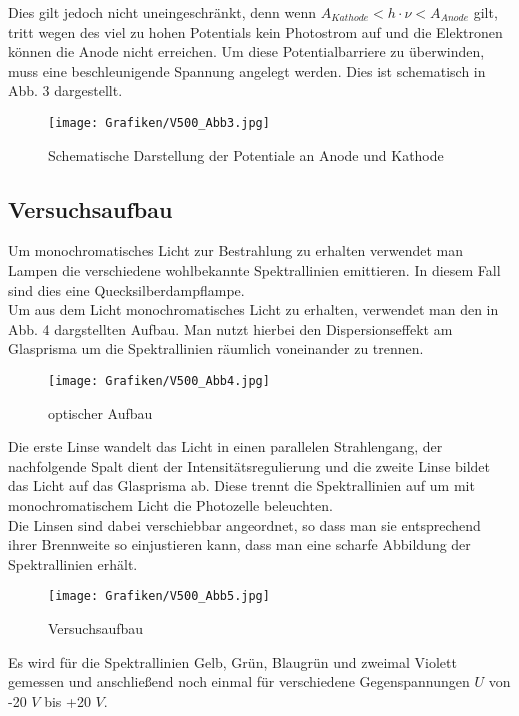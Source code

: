 Dies gilt jedoch nicht uneingeschränkt, denn wenn $A_{Kathode} < h \cdot \nu <  A_{Anode}$ gilt, tritt wegen des viel zu hohen Potentials kein Photostrom auf und die Elektronen können die Anode nicht erreichen. Um diese Potentialbarriere zu überwinden, muss eine beschleunigende Spannung angelegt werden. Dies ist schematisch in Abb. 3 dargestellt.\\

\begin{figure}[h]
	\centering
	\texttt{[image: Grafiken/V500\_Abb3.jpg]}
	\caption{Schematische Darstellung der Potentiale an Anode und Kathode}
\end{figure}

\subsection{Versuchsaufbau}

Um monochromatisches Licht zur Bestrahlung zu erhalten verwendet man Lampen die verschiedene wohlbekannte Spektrallinien emittieren. In diesem Fall sind dies eine Quecksilberdampflampe.\\
Um aus dem Licht monochromatisches Licht zu erhalten, verwendet man den in Abb. 4 dargstellten Aufbau. Man nutzt hierbei den Dispersionseffekt am Glasprisma um die Spektrallinien räumlich voneinander zu trennen. 

\begin{figure}[h]
	\centering
	\texttt{[image: Grafiken/V500\_Abb4.jpg]}
	\caption{optischer Aufbau}
\end{figure}

Die erste Linse wandelt das Licht in einen parallelen Strahlengang, der nachfolgende Spalt dient der Intensitätsregulierung und die zweite Linse bildet das Licht auf das Glasprisma ab. Diese trennt die Spektrallinien auf um mit monochromatischem Licht die Photozelle beleuchten.\\
Die Linsen sind dabei verschiebbar angeordnet, so dass man sie entsprechend ihrer Brennweite so einjustieren kann, dass man eine scharfe Abbildung der Spektrallinien erhält. 

\begin{figure}[h]
	\centering
	\texttt{[image: Grafiken/V500\_Abb5.jpg]}
	\caption{Versuchsaufbau}
\end{figure}

Es wird für die Spektrallinien Gelb, Grün, Blaugrün und zweimal Violett gemessen und anschließend noch einmal für verschiedene Gegenspannungen $U$ von -20 $V$ bis +20 $V$.
